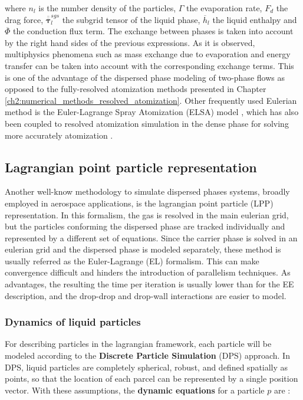 where $n_l$ is the number density of the particles, $\Gamma$ the evaporation rate, $F_{d}$ the drag force, $\overline{\overline{\pmb{\tau}}}_l^{sgs}$ the subgrid tensor of the liquid phase, $\overline{h}_l$ the liquid enthalpy and $\overline{\Phi}$ the conduction flux term. The exchange between phases is taken into account by the right hand sides of the previous expressions. As it is observed, multiphysics phenomena such as mass exchange due to evaporation and energy transfer can be taken into account with the corresponding exchange terms.  This is one of the advantage of the dispersed phase modeling of two-phase flows as opposed to the fully-resolved atomization methods presented in Chapter \ref{ch2:numerical_methods_resolved_atomization}.  Other frequently used Eulerian method is the Euler-Lagrange Spray Atomization (ELSA) model , which has also been coupled to resolved atomization simulation in the dense phase for solving more accurately atomization .

\subsection{Lagrangian point particle representation}
\label{sec:ch3_EL_formalisms}

Another well-know methodology to simulate dispersed phases systems, broadly employed in aerospace applications, is the lagrangian point particle (LPP) representation. In this formalism, the gas is resolved in the main eulerian grid, but the particles conforming the dispersed phase are tracked individually and represented by a different set of equations. Since the carrier phase is solved in an eulerian grid and the dispersed phase is modeled separately, these method is usually referred as the Euler-Lagrange (EL) formalism. This can make convergence difficult and hinders the introduction of parallelism techniques. As advantages, the resulting the time per iteration is usually lower than for the EE description, and the drop-drop and drop-wall interactions are easier to model.

\subsubsection*{Dynamics of liquid particles}

For describing particles in the lagrangian framework, each particle will be modeled according to the \textbf{Discrete Particle Simulation} (DPS) approach. In DPS, liquid particles are completely spherical, robust, and defined spatially as points, so that the location of each parcel can be represented by a single position vector. With these assumptions, the \textbf{dynamic equations} for a particle $p$ are :

